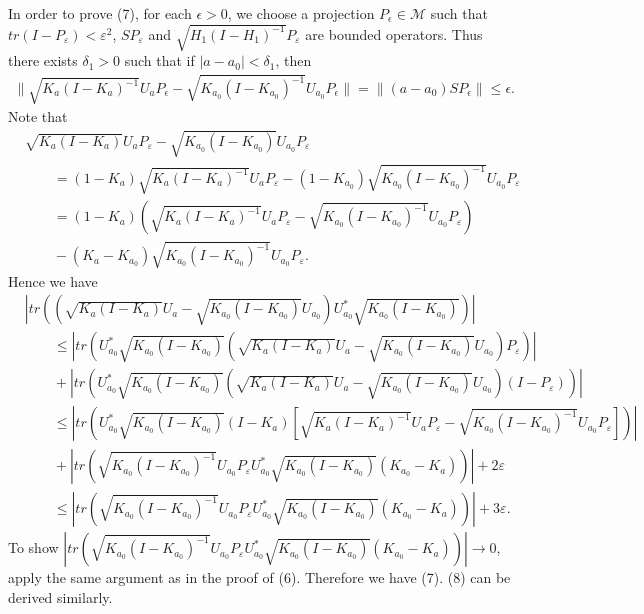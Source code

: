 \documentclass[12pt]{article}
\newcommand{\MMM}{\mathcal M}
\begin{document}
{In order to prove (7), for each $\epsilon > 0$, we choose a
projection $P_\epsilon \in \MMM$ such that $tr(I - P_{\varepsilon})
< \varepsilon^{2}$, $SP_{\varepsilon}$ and
$\sqrt{H_{1}(I-H_{1})^{-1}}P_{\varepsilon}$ are bounded operators.
Thus there exists $\delta_{1} > 0$ such that if $|a-a_{0}| <
\delta_{1}$, then
\begin{align*}
\| \sqrt{K_a(I-K_a)^{-1}}U_{a}P_{\epsilon} -
\sqrt{K_{a_0}(I-K_{a_{0}})^{-1}}U_{a_0}P_{\epsilon}  \| = \|(a - a_0)SP_{\epsilon}  \| \leq
\epsilon .
\end{align*}
Note that
\begin{align*}
&\sqrt{K_{a}(I-K_{a})}U_{a}P_{\varepsilon}
-\sqrt{K_{a_0}(I-K_{a_0})}U_{a_0}P_{\varepsilon}\\
& \qquad =(1-K_a)\sqrt{K_{a}(I-K_{a})^{-1}}U_{a}P_{\varepsilon}-(1-K_{a_0})\sqrt{K_{a_{0}}(I-K_{a_{0}})^{-1}}U_{a_0}P_{\varepsilon}\\
& \qquad =(1-K_a)(\sqrt{K_{a}(I-K_{a})^{-1}}U_{a}P_{\varepsilon}-\sqrt{K_{a_{0}}(I-K_{a_{0}})^{-1}}U_{a_0}P_{\varepsilon})\\
& \qquad    -(K_a-K_{a_0})\sqrt{K_{a_{0}}(I-K_{a_{0}})^{-1}}U_{a_0}P_{\varepsilon}.
\end{align*}
Hence we have
\begin{align*}
&|tr((\sqrt{K_{a}(I-K_{a})}U_{a}
-\sqrt{K_{a_0}(I-K_{a_0})}U_{a_0})U^{*}_{a_0}\sqrt{K_{a_0}(I-K_{a_0})})|
\\
&\qquad \leq
|tr(U^{*}_{a_0}\sqrt{K_{a_0}(I-K_{a_0})}(\sqrt{K_{a}(I-K_{a})}U_{a}
-\sqrt{K_{a_0}(I-K_{a_0})}U_{a_0})P_{\varepsilon})
| \\
&\qquad +
|tr(U^{*}_{a_0}\sqrt{K_{a_0}(I-K_{a_0})}(\sqrt{K_{a}(I-K_{a})}U_{a}
-\sqrt{K_{a_0}(I-K_{a_0})}U_{a_0})(I-P_{\varepsilon}))
| \\
&\qquad\leq
|tr(U^{*}_{a_0}\sqrt{K_{a_0}(I-K_{a_0})}(I-K_{a})[\sqrt{K_a(I-K_a)^{-1}}U_{a}P_{\varepsilon}
- \sqrt{K_{a_0}(I-K_{a_{0}})^{-1}}U_{a_0}P_{\varepsilon}]) | \\
& \qquad +
|tr(\sqrt{K_{a_0}(I-K_{a_{0}})^{-1}}U_{a_0}P_{\varepsilon}U^{*}_{a_0}\sqrt{K_{a_0}(I-K_{a_0})}(K_{a_0}
-K_a))| + 2\varepsilon \\
&\qquad \leq
|tr(\sqrt{K_{a_0}(I-K_{a_{0}})^{-1}}U_{a_0}P_{\varepsilon}U^{*}_{a_0}\sqrt{K_{a_0}(I-K_{a_0})}(K_{a_0}
-K_a))| + 3\varepsilon.
\end{align*}
To show $|tr(\sqrt{K_{a_0}(I-K_{a_{0}})^{-1}}U_{a_0}P_{\varepsilon}U^{*}_{a_0}\sqrt{K_{a_0}(I-K_{a_0})}(K_{a_0}
-K_a))| \rightarrow 0$, apply the same argument as in the proof of (6). Therefore we have (7).
(8) can be derived similarly.

}
\end{document}
